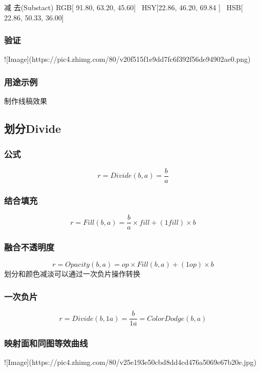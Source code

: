减    去(Substact)      RGB[ 91.80,  63.20,  45.60]~ HSY[22.86,  46.20,  69.84 ]~ HSB[ 22.86,  50.33,  36.00]


\subsubsection{ 验证}

![Image](https://pic4.zhimg.com/80/v20f515f1e9dd7fc6f392f56de94902ae0.png)

\subsubsection{用途示例}

制作线稿效果

\subsection{ 划分Divide}

\subsubsection{ 公式}

$$r=Divide(b,a)= \dfrac{b}{a}$$

\subsubsection{ 结合填充}

$$r=Fill(b,a)= \dfrac{b}{a}\times fill + (1fill)\times b$$

\subsubsection{ 融合不透明度}

$$r=Opacity(b,a)=op\times Fill(b,a)+(1op)\times b$$
划分和颜色减淡可以通过一次负片操作转换

\subsubsection{ 一次负片}

$$r=Divide(b,1a)=\dfrac{b}{1a}=ColorDodge(b,a)$$

\subsubsection{ 映射面和同图等效曲线}

![Image](https://pic4.zhimg.com/80/v25e193e50cbd8dd4cd476a5069e67b20e.jpg)

